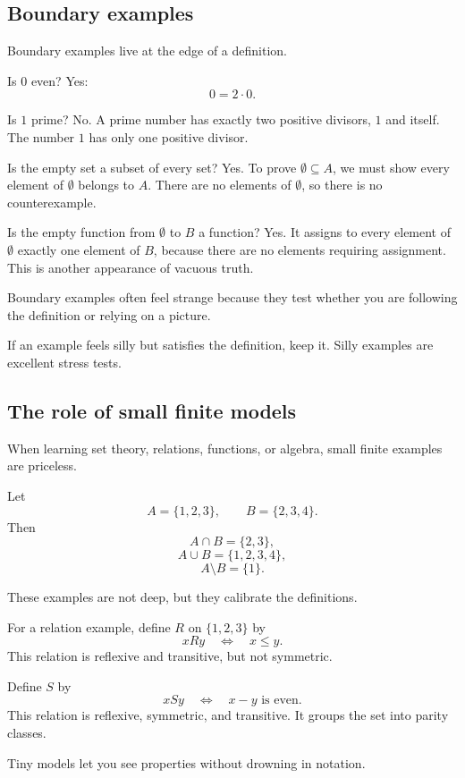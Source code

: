 \subsection{Boundary examples}

Boundary examples live at the edge of a definition.

Is $0$ even? Yes:
\[
0=2\cdot0.
\]

Is $1$ prime? No. A prime number has exactly two positive divisors, $1$ and itself. The number $1$ has only one positive divisor.

Is the empty set a subset of every set? Yes. To prove $\emptyset\subseteq A$, we must show every element of $\emptyset$ belongs to $A$. There are no elements of $\emptyset$, so there is no counterexample.

Is the empty function from $\emptyset$ to $B$ a function? Yes. It assigns to every element of $\emptyset$ exactly one element of $B$, because there are no elements requiring assignment. This is another appearance of vacuous truth.

Boundary examples often feel strange because they test whether you are following the definition or relying on a picture.

\begin{intuitionbox}
If an example feels silly but satisfies the definition, keep it. Silly examples are excellent stress tests.
\end{intuitionbox}

\subsection{The role of small finite models}

When learning set theory, relations, functions, or algebra, small finite examples are priceless.

Let
\[
A=\{1,2,3\},\qquad B=\{2,3,4\}.
\]
Then
\[
A\cap B=\{2,3\},
\]
\[
A\cup B=\{1,2,3,4\},
\]
\[
A\setminus B=\{1\}.
\]

These examples are not deep, but they calibrate the definitions.

For a relation example, define $R$ on $\{1,2,3\}$ by
\[
xRy\quad\Longleftrightarrow\quad x\leq y.
\]
This relation is reflexive and transitive, but not symmetric.

Define $S$ by
\[
xSy\quad\Longleftrightarrow\quad x-y\text{ is even}.
\]
This relation is reflexive, symmetric, and transitive. It groups the set into parity classes.

Tiny models let you see properties without drowning in notation.

